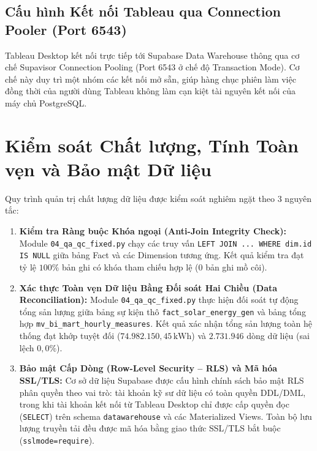 \documentclass[12pt, a4paper]{report}
\begin{document}
\subsection{Cấu hình Kết nối Tableau qua Connection Pooler (Port 6543)}

Tableau Desktop kết nối trực tiếp tới Supabase Data Warehouse thông qua cơ chế Supavisor Connection Pooling (Port 6543 ở chế độ Transaction Mode). Cơ chế này duy trì một nhóm các kết nối mở sẵn, giúp hàng chục phiên làm việc đồng thời của người dùng Tableau không làm cạn kiệt tài nguyên kết nối của máy chủ PostgreSQL.

\section{Kiểm soát Chất lượng, Tính Toàn vẹn và Bảo mật Dữ liệu}
\label{sec:qa_qc_security}

Quy trình quản trị chất lượng dữ liệu được kiểm soát nghiêm ngặt theo 3 nguyên tắc:

\begin{enumerate}[label=\textbf{\arabic*.}, leftmargin=*]
    \item \textbf{Kiểm tra Ràng buộc Khóa ngoại (Anti-Join Integrity Check):}
    Module \texttt{04\_qa\_qc\_fixed.py} chạy các truy vấn \texttt{LEFT JOIN ... WHERE dim.id IS NULL} giữa bảng Fact và các Dimension tương ứng. Kết quả kiểm tra đạt tỷ lệ $100\%$ bản ghi có khóa tham chiếu hợp lệ (0 bản ghi mồ côi).

    \item \textbf{Xác thực Toàn vẹn Dữ liệu Bằng Đối soát Hai Chiều (Data Reconciliation):}
    Module \texttt{04\_qa\_qc\_fixed.py} thực hiện đối soát tự động tổng sản lượng giữa bảng sự kiện thô \texttt{fact\_solar\_energy\_gen} và bảng tổng hợp \texttt{mv\_bi\_mart\_hourly\_measures}. Kết quả xác nhận tổng sản lượng toàn hệ thống đạt khớp tuyệt đối ($74.982.150{,}45\,\text{kWh}$) và $2.731.946$ dòng dữ liệu (sai lệch $0{,}0\%$).

    \item \textbf{Bảo mật Cấp Dòng (Row-Level Security -- RLS) và Mã hóa SSL/TLS:}
    Cơ sở dữ liệu Supabase được cấu hình chính sách bảo mật RLS phân quyền theo vai trò: tài khoản kỹ sư dữ liệu có toàn quyền DDL/DML, trong khi tài khoản kết nối từ Tableau Desktop chỉ được cấp quyền đọc (\texttt{SELECT}) trên schema \texttt{datawarehouse} và các Materialized Views. Toàn bộ lưu lượng truyền tải đều được mã hóa bằng giao thức SSL/TLS bắt buộc (\texttt{sslmode=require}).
\end{enumerate}
\end{document}
